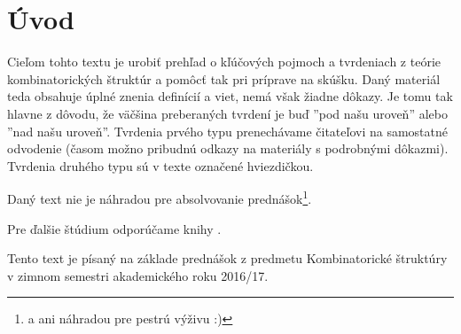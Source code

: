 \chapter*{Úvod}

Cieľom tohto textu je urobiť prehľad o kľúčových pojmoch a tvrdeniach z teórie kombinatorických štruktúr a pomôcť tak pri príprave na skúšku. 
Daný materiál teda obsahuje úplné znenia definícií a viet, nemá však žiadne dôkazy. Je tomu tak hlavne z dôvodu, že väčšina preberaných
tvrdení je buď ''pod našu uroveň'' alebo ''nad našu uroveň''. Tvrdenia prvého typu prenechávame čitateľovi na samostatné odvodenie (časom možno pribudnú odkazy
na materiály s podrobnými dôkazmi). Tvrdenia druhého typu sú v texte označené hviezdičkou.

Daný text nie je náhradou pre absolvovanie prednášok\footnote{a ani náhradou pre pestrú výživu :)}.

Pre ďalšie štúdium odporúčame knihy \TODO.

Tento text je písaný na základe prednášok z predmetu Kombinatorické štruktúry v zimnom semestri akademického roku 2016/17.

